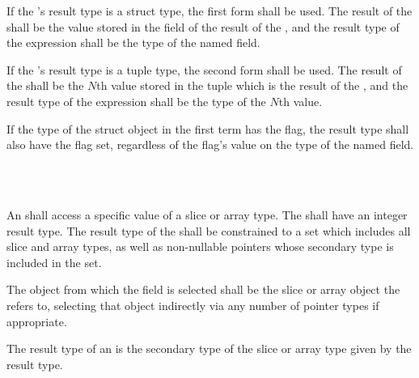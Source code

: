 \specsubsubitem
If the 's result type is a struct type, the
first form shall be used. The result of the
 shall be the value stored in the
 field of the result of the ,
and the result type of the expression shall be the type of the named field.

\specsubsubitem
If the 's result type is a tuple type,
the second form shall be used. The result of the
 shall be the $N$th value stored in the
tuple which is the result of the , and the
result type of the expression shall be the type of the $N$th value.

\specsubsubitem
If the type of the struct object in the first term has the 
flag, the result type shall also have the  flag set, regardless
of the flag's value on the type of the named field.


\begin{grammar}
 \\
	 \terminal{[}  \terminal{]} \\
\end{grammar}

\specsubsubitem
An  shall access a specific value of a slice
or array type. The  shall have an integer result type.
The result type of the  shall be constrained to
a set which includes all slice and array types, as well as non-nullable pointers
whose secondary type is included in the set.


\specsubsubitem
The object from which the field is selected shall be the slice or array object
the  refers to, selecting that object indirectly
via any number of pointer types if appropriate.

\specsubsubitem
The result type of an  is the secondary type
of the slice or array type given by the  result
type.

